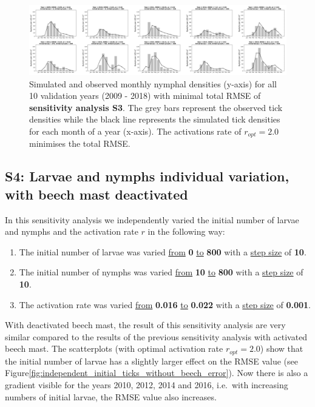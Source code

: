 \documentclass[a4paper, 11pt]{scrartcl}
\begin{document}
\begin{figure}[h!]
\centering
\includegraphics[width=\linewidth]{figures/independent_initial_ticks_with_beech}
\caption{Simulated and observed monthly nymphal densities (y-axis) for all 10 validation years (2009 - 2018) with minimal total RMSE of \textbf{sensitivity analysis S3}. The grey
bars represent the observed tick densities while the black line represents the simulated tick densities for each month of a year (x-axis). The activations rate of
$r_{opt}= 2.0$ minimises the total RMSE.}
\label{fig:independent_initial_ticks_with_beech}
\end{figure}


\subsection{S4: Larvae and nymphs individual variation, with beech mast deactivated}
In this sensitivity analysis we independently varied the initial number of larvae and nymphs and the activation rate $r$ in the following way:

\begin{enumerate}
\item The initial number of larvae was varied \underline{from} \textbf{0} \underline{to} \textbf{800} with a \underline{step size} of \textbf{10}.
\item The initial number of nymphs was varied \underline{from} \textbf{10} \underline{to} \textbf{800} with a \underline{step size} of \textbf{10}.
\item The activation rate was varied \underline{from} \textbf{0.016} \underline{to} \textbf{0.022} with a \underline{step size} of \textbf{0.001}.
\end{enumerate}

With deactivated beech mast, the result of this sensitivity analysis are very similar compared to the results of the previous sensitivity analysis with activated beech mast.
The scatterplots (with optimal activation rate $r_{opt}= 2.0$) show that the initial number of larvae has a slightly larger effect on the RMSE value (see
Figure\ref{fig:independent_initial_ticks_without_beech_error}). Now there is also a gradient visible for the years 2010, 2012, 2014 and 2016, i.e.\ with increasing numbers of
initial larvae, the RMSE value also increases.
\end{document}
